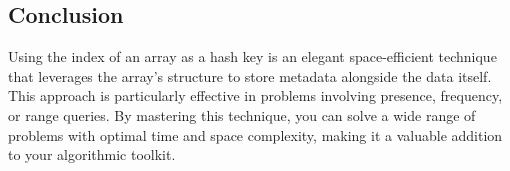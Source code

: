 \subsection*{Conclusion}
Using the index of an array as a hash key is an elegant space-efficient technique that leverages the array's structure to store metadata alongside the data itself. This approach is particularly effective in problems involving presence, frequency, or range queries. By mastering this technique, you can solve a wide range of problems with optimal time and space complexity, making it a valuable addition to your algorithmic toolkit.